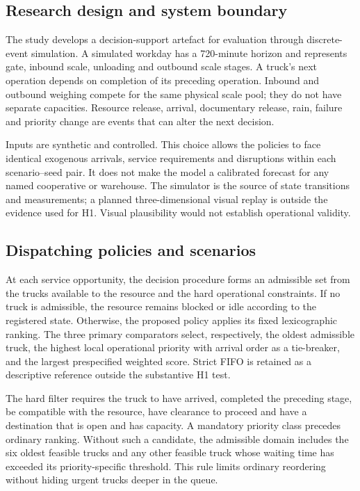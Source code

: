 \documentclass[12pt,a4paper]{article}
\begin{document}
\subsection{Research design and system boundary}

The study develops a decision-support artefact for evaluation through discrete-event simulation. A simulated workday has a 720-minute horizon and represents gate, inbound scale, unloading and outbound scale stages. A truck's next operation depends on completion of its preceding operation. Inbound and outbound weighing compete for the same physical scale pool; they do not have separate capacities. Resource release, arrival, documentary release, rain, failure and priority change are events that can alter the next decision.

Inputs are synthetic and controlled. This choice allows the policies to face identical exogenous arrivals, service requirements and disruptions within each scenario–seed pair. It does not make the model a calibrated forecast for any named cooperative or warehouse. The simulator is the source of state transitions and measurements; a planned three-dimensional visual replay is outside the evidence used for H1. Visual plausibility would not establish operational validity.

\subsection{Dispatching policies and scenarios}

At each service opportunity, the decision procedure forms an admissible set from the trucks available to the resource and the hard operational constraints. If no truck is admissible, the resource remains blocked or idle according to the registered state. Otherwise, the proposed policy applies its fixed lexicographic ranking. The three primary comparators select, respectively, the oldest admissible truck, the highest local operational priority with arrival order as a tie-breaker, and the largest prespecified weighted score. Strict FIFO is retained as a descriptive reference outside the substantive H1 test.

The hard filter requires the truck to have arrived, completed the preceding stage, be compatible with the resource, have clearance to proceed and have a destination that is open and has capacity. A mandatory priority class precedes ordinary ranking. Without such a candidate, the admissible domain includes the six oldest feasible trucks and any other feasible truck whose waiting time has exceeded its priority-specific threshold. This rule limits ordinary reordering without hiding urgent trucks deeper in the queue.
\end{document}
